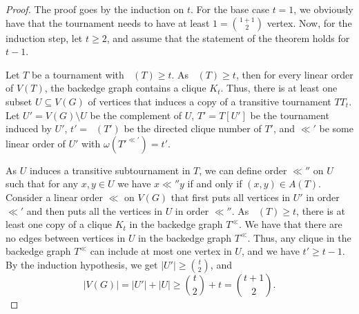 \documentclass[10pt,a4paper]{amsart}
\DeclareMathOperator{\diomega}{\ora \omega}
\newcommand{\norm}[1]{\left|#1\right|}
\newcommand{\ora}[1]{\overrightarrow{#1}}
\begin{document}
\begin{proof}
    The proof goes by the induction on $t$.
    For the base case $t=1$, we obviously have that the tournament needs to have at least $1={{1+1} \choose 2}$ vertex.
    Now, for the induction step, let $t\ge2$, and assume that the statement of the theorem holds for $t-1$.

    Let $T$ be a tournament with $\diomega(T) \ge t$.
    As $\diomega(T) \ge t$, then for every linear order of $V(T)$, the backedge graph contains a clique $K_t$.
    Thus, there is at least one subset $U \subseteq V(G)$ of vertices that induces a copy of a transitive tournament $TT_t$.
    Let $U' = V(G)\setminus U$ be the complement of $U$, $T' = T[U']$ be the tournament induced by $U'$, $t' = \diomega(T')$ be the directed clique number of $T'$, and $\ll'$ be some linear order of $U'$ with $\omega(T'^{\ll'})=t'$.

    As $U$ induces a transitive subtournament in $T$, we can define order $\ll''$ on $U$ such that for any $x,y \in U$ we have $x \ll'' y$ if and only if $(x,y) \in A(T)$.
    Consider a linear order $\ll$ on $V(G)$ that first puts all vertices in $U'$ in order $\ll'$ and then puts all the vertices in $U$ in order $\ll''$.
    As $\diomega(T) \ge t$, there is at least one copy of a clique $K_t$ in the backedge graph $T^\ll$.
    We have that there are no edges between vertices in $U$ in the backedge graph $T^\ll$.
    Thus, any clique in the backedge graph $T^\ll$ can include at most one vertex in $U$, and we have $t' \ge t-1$.
    By the induction hypothesis, we get $\norm{U'} \ge {t\choose2}$, and
    \[
        \norm{V(G)} = \norm{U'} + \norm{U} \ge {t\choose2} + t = {{t+1}\choose2}\text{.}
    \]
\end{proof}
\end{document}
